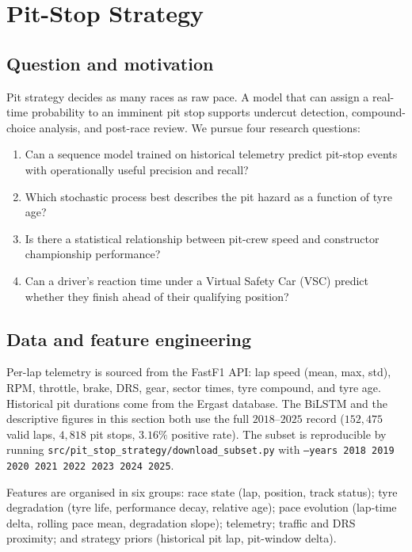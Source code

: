 \documentclass[11pt,a4paper]{article}
\newcommand{\code}[1]{\texttt{\small #1}}
\theoremstyle{remark}
\begin{document}
\section{Pit-Stop Strategy}\label{sec:pit}

\subsection{Question and motivation}
Pit strategy decides as many races as raw pace. A model that can
assign a real-time probability to an imminent pit stop supports
undercut detection, compound-choice analysis, and post-race review.
We pursue four research questions:
\begin{enumerate}
  \item Can a sequence model trained on historical telemetry predict
  pit-stop events with operationally useful precision and recall?
  \item Which stochastic process best describes the pit hazard as a
  function of tyre age?
  \item Is there a statistical relationship between pit-crew speed
  and constructor championship performance?
  \item Can a driver's reaction time under a Virtual Safety Car (VSC)
  predict whether they finish ahead of their qualifying position?
\end{enumerate}

\subsection{Data and feature engineering}
Per-lap telemetry is sourced from the FastF1 API: lap speed
(mean, max, std), RPM, throttle, brake, DRS, gear, sector times,
tyre compound, and tyre age. Historical pit durations come from the
Ergast database. The BiLSTM and the descriptive figures in this section both use the
full $2018$--$2025$ record ($152{,}475$ valid laps, $4{,}818$ pit
stops, $3.16\%$ positive rate). The subset is reproducible by running
\code{src/pit\_stop\_strategy/download\_subset.py} with
\code{--years 2018 2019 2020 2021 2022 2023 2024 2025}.

Features are organised in six groups: race state (lap, position,
track status); tyre degradation (tyre life, performance decay,
relative age); pace evolution (lap-time delta, rolling pace mean,
degradation slope); telemetry; traffic and DRS proximity; and
strategy priors (historical pit lap, pit-window delta).
\end{document}
